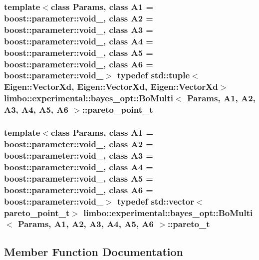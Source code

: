 \subsubsection[{pareto\+\_\+point\+\_\+t}]{\setlength{\rightskip}{0pt plus 5cm}template$<$class Params, class A1 = boost\+::parameter\+::void\+\_\+, class A2 = boost\+::parameter\+::void\+\_\+, class A3 = boost\+::parameter\+::void\+\_\+, class A4 = boost\+::parameter\+::void\+\_\+, class A5 = boost\+::parameter\+::void\+\_\+, class A6 = boost\+::parameter\+::void\+\_\+$>$ typedef std\+::tuple$<$Eigen\+::\+Vector\+Xd, Eigen\+::\+Vector\+Xd, Eigen\+::\+Vector\+Xd$>$ {\bf limbo\+::experimental\+::bayes\+\_\+opt\+::\+Bo\+Multi}$<$ Params, A1, A2, A3, A4, A5, A6 $>$\+::{\bf pareto\+\_\+point\+\_\+t}}\label{classlimbo_1_1experimental_1_1bayes__opt_1_1_bo_multi_a1a48dd47159458edc16374082379879e}
\hypertarget{classlimbo_1_1experimental_1_1bayes__opt_1_1_bo_multi_ae2b586fb9056fdfba859b288927a2f1c}{}
\subsubsection[{pareto\+\_\+t}]{\setlength{\rightskip}{0pt plus 5cm}template$<$class Params, class A1 = boost\+::parameter\+::void\+\_\+, class A2 = boost\+::parameter\+::void\+\_\+, class A3 = boost\+::parameter\+::void\+\_\+, class A4 = boost\+::parameter\+::void\+\_\+, class A5 = boost\+::parameter\+::void\+\_\+, class A6 = boost\+::parameter\+::void\+\_\+$>$ typedef std\+::vector$<${\bf pareto\+\_\+point\+\_\+t}$>$ {\bf limbo\+::experimental\+::bayes\+\_\+opt\+::\+Bo\+Multi}$<$ Params, A1, A2, A3, A4, A5, A6 $>$\+::{\bf pareto\+\_\+t}}\label{classlimbo_1_1experimental_1_1bayes__opt_1_1_bo_multi_ae2b586fb9056fdfba859b288927a2f1c}


\subsection{Member Function Documentation}
\hypertarget{classlimbo_1_1experimental_1_1bayes__opt_1_1_bo_multi_a50114c72da6ef12f29938df0c8b0bcc6}{}
